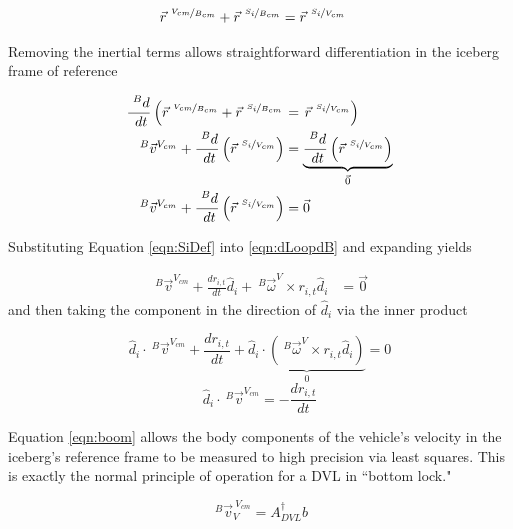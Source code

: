 \begin{align}
\vec{r}^{~\nicefrac{V_{cm}}{B_{cm}}}+ \vec{r}^{~\nicefrac{S_i}{B_{cm}}} &= \vec{r}^{~\nicefrac{S_i}{V_{cm}}}
\label{eqn:IcebergLoop}
\end{align}

Removing the inertial terms allows straightforward differentiation in the iceberg frame of reference


\begin{align} %
   \frac{~^Bd}{~dt}\left(\vec{r}^{~\nicefrac{V_{cm}}{B_{cm}}}+ \vec{r}^{~\nicefrac{S_i}{B_{cm}}}\right.& =\left. \vec{r}^{~\nicefrac{S_i}{V_{cm}}}\right)\\
   ~^B\vec{v}^{V_{cm}}  + \frac{~^Bd}{~dt}\left(\vec{r}^{~\nicefrac{S_{i}}{V_{cm}}}\right) &= \underbrace{\frac{~^Bd}{~dt}\left(\vec{r}^{~\nicefrac{S_i}{V_{cm}}}\right)}_{\vec{0}} \\
   ~^B\vec{v}^{V_{cm}}  + \frac{~^Bd}{~dt}\left(\vec{r}^{~\nicefrac{S_{i}}{V_{cm}}}\right) &= \vec{0}
   \label{eqn:dLoopdB}
\end{align}

Substituting Equation \ref{eqn:SiDef} into \ref{eqn:dLoopdB} and expanding yields

\begin{align} %
   ~^B\vec{v}^{V_{cm}}  + \frac{dr_{i,t}}{dt}\hat{d}_i + ~^B\vec{\omega}^V \times r_{i,t}\hat{d}_i&= \vec{0}
   \label{eqn:gettingClose}
\end{align}
and then taking the component  in the direction of $\hat{d}_i$ via the inner product

\begin{equation} %
   \hat{d}_i \cdot ~^B\vec{v}^{V_{cm}}  + \frac{dr_{i,t}}{dt} + \underbrace{ \hat{d}_i \cdot \left( ~^B\vec{\omega}^V \times r_{i,t}\hat{d}_i\right)}_{0} = 0
   \label{eqn:bodyVelocity}
   \end{equation}
   \begin{equation}
   \hat{d}_i \cdot ~^B\vec{v}^{V_{cm}} = - \frac{dr_{i,t}}{dt}
   \label{eqn:boom}
\end{equation}

Equation \ref{eqn:boom} allows the body components of the vehicle's velocity in the iceberg's reference frame to be measured to high precision via least squares. This is exactly the normal principle of operation for a DVL in ``bottom lock." 

   \begin{equation}
   ~^B\vec{v}^{~V_{cm}}_V = A_{DVL}^\dagger b
   \label{eqn:LSDVL}
\end{equation}

